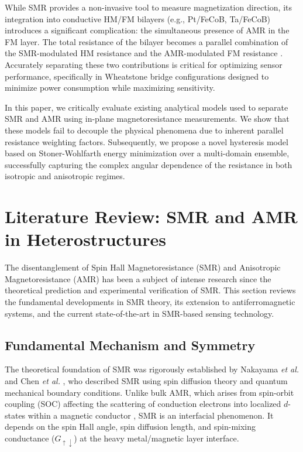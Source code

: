 \documentclass[11pt,a4paper]{article}
\begin{document}
While SMR provides a non-invasive tool to measure magnetization direction, its integration into conductive HM/FM bilayers (e.g., Pt/FeCoB, Ta/FeCoB) introduces a significant complication: the simultaneous presence of AMR in the FM layer. The total resistance of the bilayer becomes a parallel combination of the SMR-modulated HM resistance and the AMR-modulated FM resistance \cite{farwa_2026}. Accurately separating these two contributions is critical for optimizing sensor performance, specifically in Wheatstone bridge configurations designed to minimize power consumption while maximizing sensitivity.

In this paper, we critically evaluate existing analytical models used to separate SMR and AMR using in-plane magnetoresistance measurements. We show that these models fail to decouple the physical phenomena due to inherent parallel resistance weighting factors. Subsequently, we propose a novel hysteresis model based on Stoner-Wohlfarth energy minimization over a multi-domain ensemble, successfully capturing the complex angular dependence of the resistance in both isotropic and anisotropic regimes.

\section{Literature Review: SMR and AMR in Heterostructures}
The disentanglement of Spin Hall Magnetoresistance (SMR) and Anisotropic Magnetoresistance (AMR) has been a subject of intense research since the theoretical prediction and experimental verification of SMR. This section reviews the fundamental developments in SMR theory, its extension to antiferromagnetic systems, and the current state-of-the-art in SMR-based sensing technology.

\subsection{Fundamental Mechanism and Symmetry}
The theoretical foundation of SMR was rigorously established by Nakayama \textit{et al.} \cite{nakayama2013spin} and Chen \textit{et al.} \cite{chen2016theory}, who described SMR using spin diffusion theory and quantum mechanical boundary conditions. Unlike bulk AMR, which arises from spin-orbit coupling (SOC) affecting the scattering of conduction electrons into localized $d$-states within a magnetic conductor \cite{mcguire1975anisotropic}, SMR is an interfacial phenomenon. It depends on the spin Hall angle, spin diffusion length, and spin-mixing conductance ($G_{\uparrow\downarrow}$) at the heavy metal/magnetic layer interface.
\end{document}

